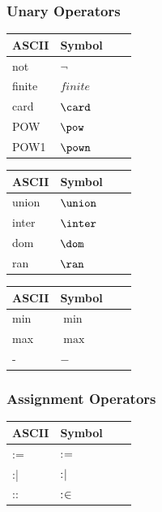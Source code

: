 \subsubsection{Unary Operators}

\begin{center}
    \begin{tabular}{ | l | l | l | p{5cm} |}
    \hline
	ASCII & Symbol \\ \hline
	not & $\neg$ \\ \hline
	finite & $finite$ \\ \hline
	card & $\card$ \\ \hline
	POW & $\pow$ \\ \hline
	POW1 & $\pown$ \\ \hline
    \end{tabular}
    \begin{tabular}{ | l | l | l | p{5cm} |}
    \hline
	ASCII & Symbol \\ \hline
	union & $\union$ \\ \hline
	inter & $\inter$ \\ \hline
	dom & $\dom$ \\ \hline
	ran & $\ran$ \\ \hline
    \end{tabular}
    \begin{tabular}{ | l | l | l | p{5cm} |}
    \hline
	ASCII & Symbol \\ \hline
	min & $\min$ \\ \hline
	max & $\max$ \\ \hline
	- & $-$ \\ \hline
    \end{tabular}
\end{center}

\subsubsection{Assignment Operators}

\begin{center}
    \begin{tabular}{ | l | l | l | p{5cm} |}
    \hline
	ASCII & Symbol \\ \hline
	:= & $\mathrel{:\mkern1mu=}$ \\ \hline
	:| & $\mathrel{:\mkern1mu\mid}$ \\ \hline
	:: & $\mathrel{:\mkern1mu\in}$ \\ \hline
    \end{tabular}
\end{center}

